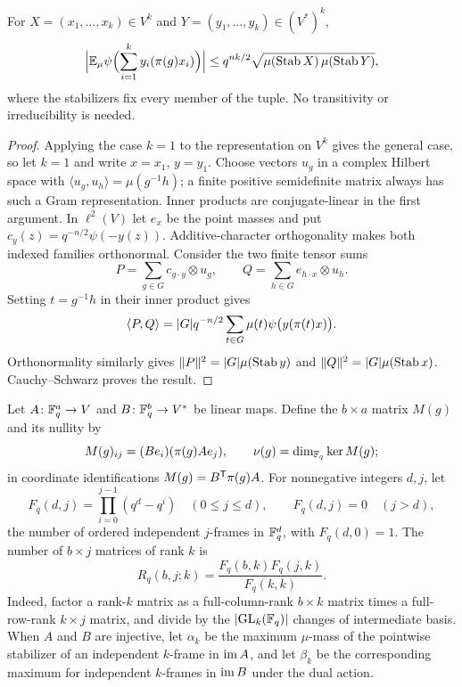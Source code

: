 \begin{lemma}\label{spn:lem:positive-coefficient}
For $X=(x_1,\dots,x_k)\in V^k$ and $Y=(y_1,\dots,y_k)\in(V^*)^k$,
\begin{equation}\label{spn:eq:frame-coefficient}
 \abs[\Big]{\spnE_\mu\psi\Bigl(\sum_{i=1}^ky_i(\pi(g)x_i)\Bigr)}
 \le q^{nk/2}\sqrt{\mu(\spnStab X)\,\mu(\spnStab Y)} ,
\end{equation}
where the stabilizers fix every member of the tuple. No transitivity or
irreducibility is needed.
\end{lemma}

\begin{proof}
Applying the case $k=1$ to the representation on $V^k$ gives the general case,
so let $k=1$ and write $x=x_1$, $y=y_1$. Choose vectors $u_g$ in a complex
Hilbert space with $\langle u_g,u_h\rangle=\mu(g^{-1}h)$; a finite positive
semidefinite matrix always has such a Gram representation. Inner products are
conjugate-linear in the first argument. In $\ell^2(V)$ let $e_x$ be the point
masses and put $c_y(z)=q^{-n/2}\psi(-y(z))$. Additive-character orthogonality
makes both indexed families orthonormal. Consider the two finite tensor sums
\[
 P=\sum_{g\in G}c_{g\cdot y}\otimes u_g,\qquad
 Q=\sum_{h\in G}e_{h\cdot x}\otimes u_h .
\]
Setting $t=g^{-1}h$ in their inner product gives
\[
 \langle P,Q\rangle
 =\abs{G}q^{-n/2}\sum_{t\in G}\mu(t)\psi\bigl(y(\pi(t)x)\bigr).
\]
Orthonormality similarly gives $\norm{P}^2=\abs{G}\mu(\spnStab y)$ and
$\norm{Q}^2=\abs{G}\mu(\spnStab x)$. Cauchy--Schwarz proves the result.
\end{proof}

Let $A\colon\F_q^a\to V$ and $B\colon\F_q^b\to V^*$ be linear maps. Define the
$b\times a$ matrix $M(g)$ and its nullity by
\[
 M(g)_{ij}=(Be_i)(\pi(g)Ae_j),\qquad\nu(g)=\dim_{\F_q}\ker M(g);
\]
in coordinate identifications $M(g)=B^{\spnT}\pi(g)A$. For nonnegative
integers $d,j$, let
\[
 F_q(d,j)=\prod_{i=0}^{j-1}(q^d-q^i)\quad(0\le j\le d),\qquad
 F_q(d,j)=0\quad(j>d),
\]
the number of ordered independent $j$-frames in $\F_q^d$, with $F_q(d,0)=1$.
The number of $b\times j$ matrices of rank $k$ is
\begin{equation}\label{spn:eq:rank-matrix-count}
 R_q(b,j;k)=\frac{F_q(b,k)F_q(j,k)}{F_q(k,k)} .
\end{equation}
Indeed, factor a rank-$k$ matrix as a full-column-rank $b\times k$ matrix
times a full-row-rank $k\times j$ matrix, and divide by the
$\abs{\GL_k(\F_q)}$ changes of intermediate basis. When $A$ and $B$ are
injective, let $\alpha_k$ be the maximum $\mu$-mass of the pointwise
stabilizer of an independent $k$-frame in $\spnim A$, and let $\beta_k$ be
the corresponding maximum for independent $k$-frames in $\spnim B$ under the
dual action.

